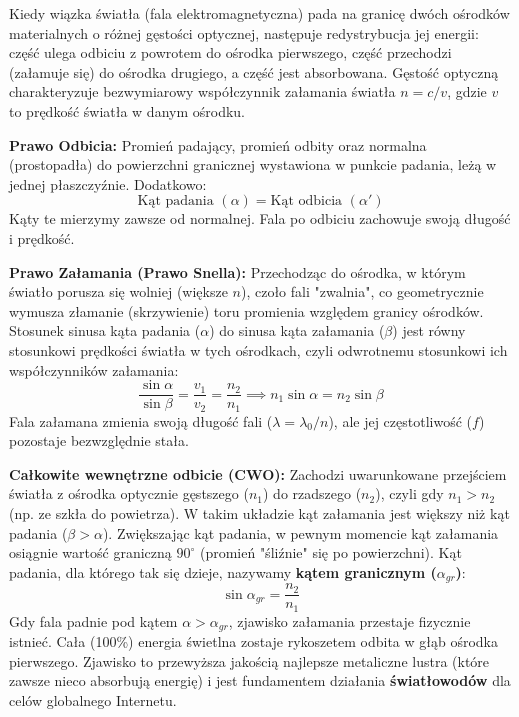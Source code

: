 \documentclass[11pt, a4paper]{article}
\begin{document}
Kiedy wiązka światła (fala elektromagnetyczna) pada na granicę dwóch ośrodków materialnych o różnej gęstości optycznej, następuje redystrybucja jej energii: część ulega odbiciu z powrotem do ośrodka pierwszego, część przechodzi (załamuje się) do ośrodka drugiego, a część jest absorbowana. Gęstość optyczną charakteryzuje bezwymiarowy współczynnik załamania światła $n = c/v$, gdzie $v$ to prędkość światła w danym ośrodku.

\textbf{Prawo Odbicia:}
Promień padający, promień odbity oraz normalna (prostopadła) do powierzchni granicznej wystawiona w punkcie padania, leżą w jednej płaszczyźnie. Dodatkowo:
\[
\text{Kąt padania } (\alpha) = \text{Kąt odbicia } (\alpha')
\]
Kąty te mierzymy zawsze od normalnej. Fala po odbiciu zachowuje swoją długość i prędkość.

\textbf{Prawo Załamania (Prawo Snella):}
Przechodząc do ośrodka, w którym światło porusza się wolniej (większe $n$), czoło fali "zwalnia", co geometrycznie wymusza złamanie (skrzywienie) toru promienia względem granicy ośrodków. Stosunek sinusa kąta padania ($\alpha$) do sinusa kąta załamania ($\beta$) jest równy stosunkowi prędkości światła w tych ośrodkach, czyli odwrotnemu stosunkowi ich współczynników załamania:
\[
\frac{\sin\alpha}{\sin\beta} = \frac{v_1}{v_2} = \frac{n_2}{n_1} \implies n_1 \sin\alpha = n_2 \sin\beta
\]
Fala załamana zmienia swoją długość fali ($\lambda = \lambda_0 / n$), ale jej częstotliwość ($f$) pozostaje bezwzględnie stała.

\textbf{Całkowite wewnętrzne odbicie (CWO):}
Zachodzi uwarunkowane przejściem światła z ośrodka optycznie gęstszego ($n_1$) do rzadszego ($n_2$), czyli gdy $n_1 > n_2$ (np. ze szkła do powietrza). W takim układzie kąt załamania jest większy niż kąt padania ($\beta > \alpha$). Zwiększając kąt padania, w pewnym momencie kąt załamania osiągnie wartość graniczną $90^\circ$ (promień "śliźnie" się po powierzchni). Kąt padania, dla którego tak się dzieje, nazywamy \textbf{kątem granicznym ($\alpha_{gr}$)}:
\[
\sin\alpha_{gr} = \frac{n_2}{n_1}
\]
Gdy fala padnie pod kątem $\alpha > \alpha_{gr}$, zjawisko załamania przestaje fizycznie istnieć. Cała (100\%) energia świetlna zostaje rykoszetem odbita w głąb ośrodka pierwszego. Zjawisko to przewyższa jakością najlepsze metaliczne lustra (które zawsze nieco absorbują energię) i jest fundamentem działania \textbf{światłowodów} dla celów globalnego Internetu.
\end{document}
